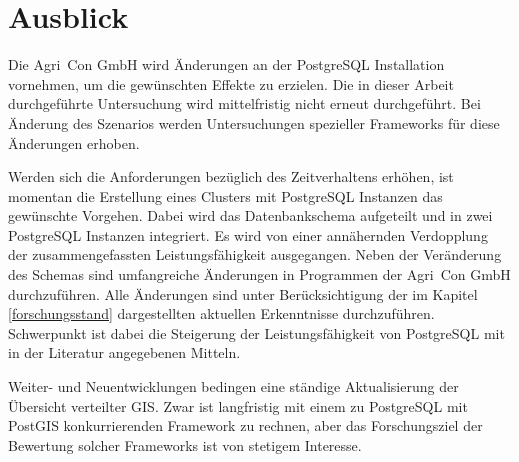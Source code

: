 \section{Ausblick}
Die Agri~Con GmbH wird Änderungen an der PostgreSQL Installation vornehmen, um die gewünschten Effekte zu erzielen.
Die in dieser Arbeit durchgeführte Untersuchung wird mittelfristig nicht erneut durchgeführt.
Bei Änderung des Szenarios werden Untersuchungen spezieller Frameworks für diese Änderungen erhoben.

Werden sich die Anforderungen bezüglich des Zeitverhaltens erhöhen, ist momentan die Erstellung eines Clusters mit PostgreSQL Instanzen das gewünschte Vorgehen.
Dabei wird das Datenbankschema aufgeteilt und in zwei PostgreSQL Instanzen integriert.
Es wird von einer annähernden Verdopplung der zusammengefassten Leistungsfähigkeit ausgegangen.
Neben der Veränderung des Schemas sind umfangreiche Änderungen in Programmen der Agri~Con GmbH durchzuführen.
Alle Änderungen sind unter Berücksichtigung der im Kapitel \ref{forschungsstand} dargestellten aktuellen Erkenntnisse durchzuführen.
Schwerpunkt ist dabei die Steigerung der Leistungsfähigkeit von PostgreSQL mit in der Literatur angegebenen Mitteln.

Weiter- und Neuentwicklungen bedingen eine ständige Aktualisierung der Übersicht verteilter GIS.
Zwar ist langfristig mit einem zu PostgreSQL mit PostGIS konkurrierenden Framework zu rechnen, aber das Forschungsziel der Bewertung solcher Frameworks ist von stetigem Interesse.


\label{LastPage}